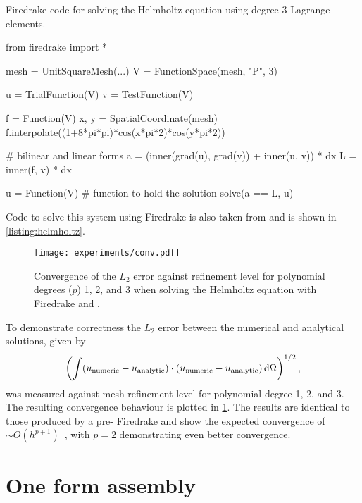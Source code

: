 \documentclass[thesis]{subfiles}
\begin{document}
\begin{listing}
  \centering
  \caption{Firedrake code for solving the Helmholtz equation using degree 3 Lagrange elements.}
  \begin{minipage}{.9\textwidth}
    \begin{pyalg2}
      from firedrake import *

      mesh = UnitSquareMesh(...)
      V = FunctionSpace(mesh, "P", 3)

      u = TrialFunction(V)
      v = TestFunction(V)

      f = Function(V)
      x, y = SpatialCoordinate(mesh)
      f.interpolate((1+8*pi*pi)*cos(x*pi*2)*cos(y*pi*2))

      # bilinear and linear forms
      a = (inner(grad(u), grad(v)) + inner(u, v)) * dx
      L = inner(f, v) * dx

      u = Function(V)  # function to hold the solution
      solve(a == L, u)
    \end{pyalg2}
  \end{minipage}
  \label{listing:helmholtz}
\end{listing}

Code to solve this system using Firedrake is also taken from \cite{FiredrakeUserManual} and is shown in \cref{listing:helmholtz}.

\begin{figure}
  \centering
  \texttt{[image: experiments/conv.pdf]}
  \caption{
    Convergence of the $L_2$ error against refinement level for polynomial degrees ($p$) 1, 2, and 3 when solving the Helmholtz equation with Firedrake and .
  }
  \label{fig:helmholtz_conv}
\end{figure}

To demonstrate correctness the $L_2$ error between the numerical and analytical solutions, given by
\begin{equation}
  \left( \int (u_{\textnormal{numeric}}-u_{\textnormal{analytic}}) \cdot (u_{\textnormal{numeric}}-u_{\textnormal{analytic}}) \, \textnormal{d}\Omega \right)^{1/2},
\end{equation}
was measured against mesh refinement level for polynomial degree 1, 2, and 3.
The resulting convergence behaviour is plotted in \cref{fig:helmholtz_conv}.
The results are identical to those produced by a pre- Firedrake and show the expected convergence of $\sim O(h^{p+1})$~\cite{brennerMathematicalTheoryFinite2008}, with $p=2$ demonstrating even better convergence.

\section{One form assembly}
\label{sec:demo_apps_one_form_assembly}
\end{document}

